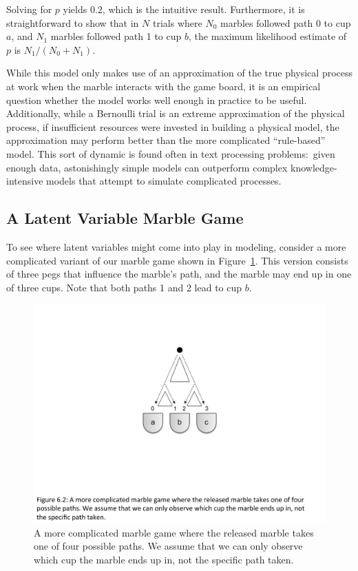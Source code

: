 \noindent Solving for $p$ yields $0.2$, which is the intuitive result.
Furthermore, it is straightforward to show that in $N$ trials where
$N_0$ marbles followed path 0 to cup $a$, and $N_1$ marbles followed
path 1 to cup $b$, the maximum likelihood estimate of $p$ is $N_1 /
(N_0 + N_1)$.

While this model only makes use of an approximation of the true
physical process at work when the marble interacts with the game
board, it is an empirical question whether the model works well enough
in practice to be useful.  Additionally, while a Bernoulli trial is an
extreme approximation of the physical process, if insufficient
resources were invested in building a physical model, the
approximation may perform better than the more complicated
``rule-based'' model.  This sort of dynamic is found often in text
processing problems:\ given enough data, astonishingly simple models
can outperform complex knowledge-intensive models that attempt to
simulate complicated processes.

\subsection{A Latent Variable Marble Game}
\label{chapter6_em_example}

To see where latent variables might come into play in modeling,
consider a more complicated variant of our marble game shown in
Figure~\ref{chapter6_figure_plinko2}.  This version consists of three
pegs that influence the marble's path, and the marble may end up in
one of three cups.  Note that both paths 1 and 2 lead to cup $b$.

\begin{figure}[t]
\begin{center}
\includegraphics[scale=0.6]{figures/fig-ch6-em-marble2.pdf}
\end{center}\caption{A more complicated marble game where the released marble takes one of four possible paths.  We assume that we can only observe which cup the marble ends up in, not the specific path taken.}\label{chapter6_figure_plinko2}
\end{figure}

